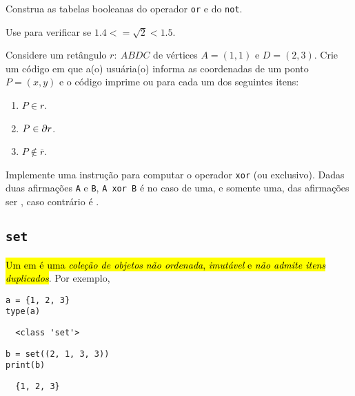 \documentclass[12pt]{article}
\begin{document}
\begin{exr}
  Construa as tabelas booleanas do operador \texttt{or} e do \texttt{not}.
\end{exr}

\begin{exr}
  Use {\python} para verificar se $1.4 <= \sqrt{2} < 1.5$.
\end{exr}

\begin{exr}
  Considere um retângulo $r: ~ABDC$ de vértices $A = (1, 1)$ e $D = (2, 3)$. Crie um código em que a(o) usuária(o) informa as coordenadas de um ponto $P = (x, y)$ e o código imprime {\PYTHONTrue} ou {\PYTHONFalse} para cada um dos seguintes itens:
  \begin{enumerate}
  \item $P\in r$.
  \item $P\in \partial r$.
  \item $P\not\in \overline{r}$.
  \end{enumerate}
\end{exr}

\begin{exr}
  Implemente uma instrução para computar o operador \texttt{xor} (ou exclusivo). Dadas duas afirmações \texttt{A} e \texttt{B}, \texttt{A xor B} é {\PYTHONTrue} no caso de uma, e somente uma, das afirmações ser {\PYTHONFalse}, caso contrário é {\PYTHONFalse}.
\end{exr}


\subsection{\texttt{set}}

\hl{Um {\PYTHONset} em {\python} é uma \emph{coleção de objetos} \emph{não ordenada}, \emph{imutável} e \emph{não admite itens duplicados}}. Por exemplo,

\begin{lstlisting}
a = {1, 2, 3}
type(a)  
\end{lstlisting}

\begin{verbatim}
  <class 'set'>
\end{verbatim}

\begin{lstlisting}
b = set((2, 1, 3, 3))
print(b)
\end{lstlisting}

\begin{verbatim}
  {1, 2, 3}
\end{verbatim}
\end{document}
